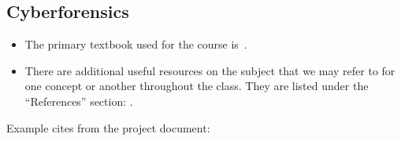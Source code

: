 \documentclass{easychair}
\begin{document}
\subsection{{\marfcat}}

\cite{%
marfcat-sate2010-nist,%
marfcat-nlp-ai2014,%
marfcat-signal-swan2015,%
khodadadi-mcthesis2015,%
fingerprinting-mal-traffic,%
mal-traffic-classification-dpi-headers,%
marf-into-flucid-cisse08,%
marf-writer-ident,%
marf-file-type,%
marf-c3s2e08%
}

\subsection{Cyberforensics}
%
\begin{itemize}
	\item 
The primary textbook used
for the course is~\cite{boismenu-inse691e-f2012}.
	\item 
There are additional useful resources on the subject that we may refer to for one concept
or another throughout the class. They are listed under the ``References'' section:
\cite{%
win-net-forensics-investigation-2012,%
understand-caf-for-success-investigation,%
craigball,%
know-your-enemy-2004,%
incident-response-comp-forensics-2004,%
helix-forensic-toolkit,%
sleuthkit,%
forensics-tasks,%
forensic-memory-analysis-07,%
forensic-log-analysis-07,%
forensic-email-analysis-09,%
gladyshev-phd-2004,%
printer-case,%
blackmail-case,%
debbabi-inse6150-2006-formal-analysis,%
debbabi-inse6120-2005,%
mokhov-phd-thesis-2013,%
mac-spoofer-analyzer-detail-fps2014,%
ftklipse,ftklipse-srs,ftklipse-sdd%
}.
\end{itemize}


Example cites from the project document:
\end{document}
